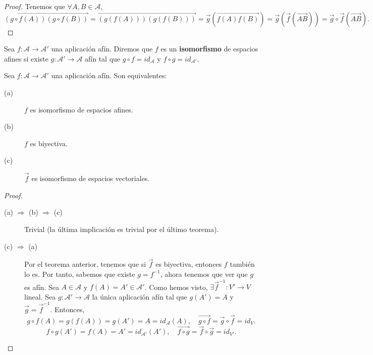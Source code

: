 \begin{proof}
Tenemos que $\displaystyle \forall A,B \in \mathcal{A} $, 
\[\overrightarrow{\left(g\circ f\left(A\right)\right)\left(g\circ f\left(B\right)\right)} = \overrightarrow{\left(g\left(f\left(A\right)\right)\right)\left(g\left(f\left(B\right)\right)\right)} = \vec{g}\left(\overrightarrow{f\left(A\right)f\left(B\right)}\right) = \vec{g}\left(\vec{f}\left(\overrightarrow{AB}\right)\right) = \vec{g}\circ\vec{f}\left(\overrightarrow{AB}\right) .\]
\end{proof}
\begin{fdefinition}
\normalfont Sea $\displaystyle f : \mathcal{A} \to \mathcal{A}' $ una aplicación afín. Diremos que $\displaystyle f $ es un \textbf{isomorfismo} de espacios afines si existe $\displaystyle g : \mathcal{A}' \to \mathcal{A} $ afín tal que $\displaystyle g\circ f = id _{\mathcal{A}} $ y $\displaystyle f\circ g = id _{\mathcal{A}'} $.
\end{fdefinition}
\begin{fprop}[]
\normalfont Sea $\displaystyle f : \mathcal{A} \to \mathcal{A}' $ una aplicación afín. Son equivalentes:
\begin{description}
\item[(a)] $\displaystyle f $ es isomorfismo de espacios afines.
\item[(b)] $\displaystyle f $ es biyectiva.
\item[(c)] $\displaystyle \vec{f} $ es isomorfismo de espacios vectoriales.
\end{description}
\end{fprop}
\begin{proof}
\begin{description}
\item[(a) $\displaystyle \Rightarrow $ (b) $\displaystyle \Rightarrow $ (c)] Trivial (la última implicación es trivial por el último teorema).
\item[(c) $\displaystyle \Rightarrow $ (a)] Por el teorema anterior, tenemos que si $\displaystyle \vec{f} $ es biyectiva, entonces $\displaystyle f $ también lo es. Por tanto, sabemos que existe $\displaystyle g = f^{-1} $, ahora tenemos que ver que $\displaystyle g $ es afín. Sea $\displaystyle A \in \mathcal{A} $ y $\displaystyle f\left(A\right) = A' \in \mathcal{A}' $. Como hemos visto, $\displaystyle \exists \vec{f}^{-1} : V' \to V $ lineal. Sea $\displaystyle g : \mathcal{A}' \to \mathcal{A} $ la única aplicación afín tal que $\displaystyle g\left(A'\right) = A $ y $\displaystyle \vec{g} = \vec{f}^{-1} $.
Entonces, 
\[g\circ f\left(A\right) = g\left(f\left(A\right)\right) = g\left(A'\right) = A = id _{\mathcal{A}}\left(A\right), \quad \overrightarrow{g \circ f} = \vec{g}\circ\vec{f} = id _{V} .\]
\[ f\circ g\left(A'\right)= f\left(A\right) = A' = id _{\mathcal{A}'}\left(A'\right), \quad \overrightarrow{f\circ g} = \vec{f}\circ \vec{g} = id _{V'}.\]
\end{description}
\end{proof}
